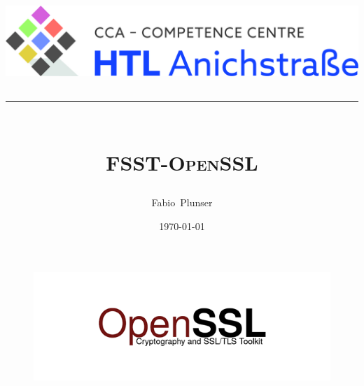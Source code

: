 \documentclass[12pt]{article}
\title{
  \vspace{-2cm}
  \centering
  \includegraphics[width=\linewidth]{htl-logo.jpg}\\
  \rule{\linewidth}{1pt}\\
  \vspace{50px}
  \Huge\textbf{\textsc{FSST-OpenSSL}}
  \normalsize
}
\author{Fabio~Plunser}
\date{\today}
\begin{document}

\begin{titlepage}
  \maketitle
  \begin{figure}[!htb]
    \centering
    \includegraphics[scale=0.5]{OpenSSL.png}
    \label{UART-TitelBild}
  \end{figure}

  
\end{titlepage}


\pagebreak
\thispagestyle{empty}
\renewcommand\contentsname{Inhaltsverzeichnis}
\tableofcontents	
{}


\thispagestyle{empty}
\renewcommand\listfigurename{Abbildungsverzeichnis}
\listoffigures
\renewcommand\lstlistlistingname{Code}
\lstlistoflistings
\end{document}
